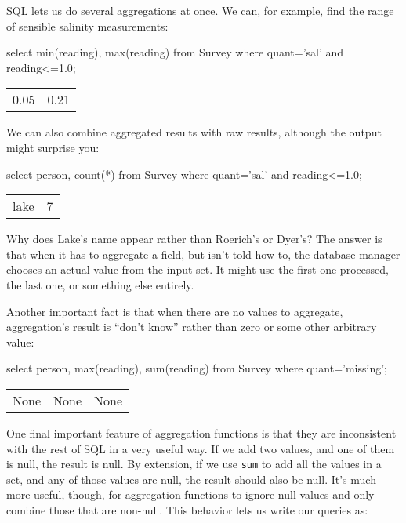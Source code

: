 \documentclass{book}
\begin{document}
SQL lets us do several aggregations at once. We can, for example, find
the range of sensible salinity measurements:

\begin{VerbIn}
select min(reading), max(reading) from Survey where quant='sal' and reading<=1.0;
\end{VerbIn}

\begin{tabular}{ll}
0.05 & 0.21 \\
\end{tabular}

We can also combine aggregated results with raw results, although the
output might surprise you:

\begin{VerbIn}
select person, count(*) from Survey where quant='sal' and reading<=1.0;
\end{VerbIn}

\begin{tabular}{ll}
lake & 7 \\
\end{tabular}

Why does Lake's name appear rather than Roerich's or Dyer's? The answer
is that when it has to aggregate a field, but isn't told how to, the
database manager chooses an actual value from the input set. It might
use the first one processed, the last one, or something else entirely.

Another important fact is that when there are no values to aggregate,
aggregation's result is ``don't know'' rather than zero or some other
arbitrary value:

\begin{VerbIn}
select person, max(reading), sum(reading) from Survey where quant='missing';
\end{VerbIn}

\begin{tabular}{lll} %
None & None & None \\
\end{tabular}

One final important feature of aggregation functions is that they are
inconsistent with the rest of SQL in a very useful way. If we add two
values, and one of them is null, the result is null. By extension, if we
use \texttt{sum} to add all the values in a set, and any of those values
are null, the result should also be null. It's much more useful, though,
for aggregation functions to ignore null values and only combine those
that are non-null. This behavior lets us write our queries as:
\end{document}
